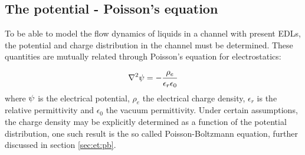 \subsection{The potential - Poisson's equation}\label{sec:et:poisson}
To be able to model the flow dynamics of liquids in a channel with
present EDLs, the potential and charge distribution
in the channel must be determined. These quantities are mutually
related through Poisson's equation for electrostatics:

\begin{equation}\label{eq:pb}
\nabla^2\mathrm{\psi} = -\frac{\rho_e}{\epsilon_r \epsilon_0}
\end{equation}
where $\mathrm{\psi}$ is the electrical potential, $\rho_e$ the electrical
charge density, $\epsilon_r$ is the relative permittivity and
$\epsilon_0$ the vacuum permittivity. Under certain assumptions, the
charge density may be explicitly determined as a function of the
potential distribution, one such result is the so called
Poisson-Boltzmann equation, further discussed in section \ref{sec:et:pb}.
